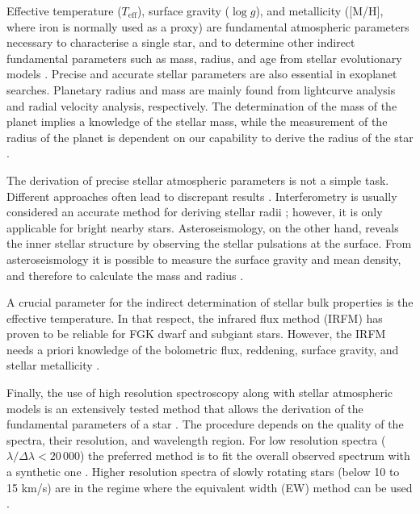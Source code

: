 \documentclass{aa}
\begin{document}
Effective temperature ($T_\mathrm{eff}$), surface gravity ($\log g$),
and metallicity ([M/H], where iron is normally used as a proxy)
are fundamental atmospheric parameters necessary to characterise a single
star, and to determine other indirect fundamental parameters
such as mass, radius, and age from stellar evolutionary models
\citep[see e.g.][]{Girardi2000,Dotter2008,Baraffe2015}.
Precise and accurate stellar parameters are also essential in
exoplanet searches. Planetary radius and mass are mainly found from
lightcurve analysis and radial velocity analysis, respectively. The
determination of the mass of the planet implies a knowledge of the
stellar mass, while the measurement of the radius of the planet
is dependent on our capability to derive the radius of the star
\citep[see e.g.][]{Torres2008,Ammler2009,Torres2012}.

The derivation of precise stellar atmospheric parameters is not a simple task.
Different approaches often lead to discrepant results
\citep[see e.g.][]{Santos13}. Interferometry is usually considered  an accurate
method for deriving stellar radii \citep[e.g.][]{Boyajian2012}; however, it is
only applicable for bright nearby stars. Asteroseismology, on the other hand,
reveals the inner stellar structure by observing the stellar pulsations at the
surface. From asteroseismology it is possible to measure the surface gravity and
mean density, and therefore to calculate the mass and radius
\citep[e.g.][]{Kjeldsen1995}.

A crucial parameter for the indirect determination of stellar bulk
properties is the effective temperature. In that respect, the infrared
flux method (IRFM) has proven to be reliable for FGK dwarf and
subgiant stars. However, the IRFM needs a priori knowledge of the
bolometric flux, reddening, surface gravity, and stellar metallicity
\citep{Blackwell1977,Ramirez2005b,Casagrande2010}.

Finally, the use of high resolution spectroscopy along with stellar atmospheric
models is an extensively tested method that allows the derivation of the
fundamental parameters of a star \citep[see e.g.][]{Valenti2005,Santos13}. The
procedure depends on the quality of the spectra, their resolution, and
wavelength region. For low resolution spectra ($\lambda/\Delta\lambda <
20\,000$) the preferred method is to fit the overall observed spectrum with a
synthetic one \citep[see e.g.][]{Recio2006}. Higher resolution spectra of slowly
rotating stars (below 10 to 15 \si{km/s})  are in the regime where the
equivalent width (EW) method can be used
\citep[see e.g.][for details]{Andreasen2017a}.
\end{document}
